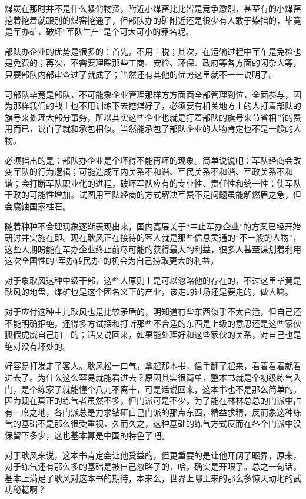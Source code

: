 煤炭在那时并不是什么紧俏物资，附近小煤窑比比皆是竞争激烈，甚至有的小煤窑挖着挖着就跟别的煤窑挖通了，但部队办的矿附近还是很少有人敢于染指的，毕竟是军办矿，破坏“军队生产”是个可大可小的罪名呢。

部队办企业的优势是很多的：首先，不用上税；其次，在运输过程中军车是免检也是免费的；再次，不需要理睬那些工商、安检、环保、政府等各方面的闲杂人等，只要部队内部审查过了就成了；当然还有其他的优势这里就不一一说明了。

可部队毕竟是部队，不可能象企业管理那样方方面面全部管理到位，全面参与，因为那样我们的战士也不用训练下去挖煤好了，必须要有相关地方上的人打着部队的旗号来处理大部分事务，所以其实这些企业也就是打着部队的旗号来节省相当的费用而已，说白了就和承包相似。当然能承包了部队企业的人物肯定也不是一般的人物。

必须指出的是：部队办企业是个坏得不能再坏的现象。简单说说吧：军队经商会改变军队的行为逻辑；可能造成军内关系不和谐、军民关系不和谐、军政关系不和谐；会打断军队职业化的进程，破坏军队应有的专业性、责任性和统一性；使军队干政的可能性增加。试图用军队经商的方式解决军费不足问题虽能解燃眉之急，但会腐蚀国家柱石。

随着种种不合理现象逐渐表现出来，国内高层关于“中止军办企业”的方案已经开始研讨并实施在即。现在耿风正在接待的客人就是那些信息灵通的“不一般的人物”，这些人期盼能在军办企业终止前尽可能的获得最大的利益，很多人甚至谋划着利用这次全国性的“军办转民办”的机会为自己捞取更大的利益。

对于象耿风这种中级干部，这些人原则上是可以忽略他的存在的，不过这里毕竟是耿风的地盘，煤矿也是这个团名义下的产业，该走的过场还是要走的，做人嘛。

对于应付这种主儿耿风也是比较矛盾的，明知道有些东西似乎不太合适，但自己还不能明确拒绝，还得多方试探和打听那些不合适的东西是上级的意思还是这些家伙狐假虎威自己加上的；话又说回来，如果能处理好和这些家伙的关系，对自己也是绝对没有坏处的。

好容易打发走了客人。耿风松一口气，拿起那本书，信手翻了起来，看着看着就看进去了。为什么这么容易就能看进去？原因其实很简单，整本书就是个初级练气入门，是个练家子就能懂个八九不离十，可是话说回来，这本书也不是那么简单的。因为现在真正的练气者虽然不多，但门派可是不少，为了能在林林总总的门派中占有一席之地，各门派总是力求钻研自己门派的那点东西，精益求精，反而象这种练气的基础不是那么很受重视，久而久之，这种基础的练气方式反而在各个门派中没保留下多少，这也基本算是中国的特色了吧。

对于耿风来说，这本书肯定会让他受益的，但更重要的是让他开阔了眼界，原来，对于练气还有那么多的基础是被自己忽略了的，哈，确实是开眼了。总之一句话，基本上满足了耿风对这本书的期待，本来么，世界上哪里来的那么多惊天动地的武功秘籍啊？

